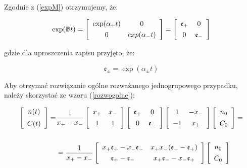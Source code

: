 	\noindent Zgodnie z (\ref{expM}) otrzymujemy, że:
	
	\begin{equation}
		\exp(\mathbb{B}t)=
		\left[\begin{array}{cc}
			\exp(\alpha_+t)&0\\
			\uu{0}&exp(\alpha_-t)
		\end{array}\right]=
		\left[\begin{array}{cc}
			\mathfrak{e}_+&0\\
			\uu{0}&\mathfrak{e}_-
		\end{array}\right]
		\label{expBe}
	\end{equation}
	
	\noindent gdzie dla uproszczenia zapisu przyjęto, że:
	
	\begin{equation}
		\mathfrak{e}_{\pm}=\exp(\alpha_{\pm}t)
		\label{eee}
	\end{equation}
	
	\noindent Aby otrzymać rozwiązanie ogólne rozważanego jednogrupowego przypadku, należy skorzystać ze wzoru (\ref{rozwogolne}):
	
	\begin{equation}
		\begin{aligned}
			\left[\begin{array}{c}
				n(t)\\
				\uu{C(t)}
			\end{array}\right]=&\frac{1}{x_+-x_-}
			\left[\begin{array}{cc}
				x_+&x_-\\
				\uu{1}&1
			\end{array}\right]
			\left[\begin{array}{cc}
				\mathfrak{e}_+&0\\
				\uu{0}&\mathfrak{e}_-
			\end{array}\right]
			\left[\begin{array}{cc}
				1&-x_-\\
				\uu{-1}&x_+
			\end{array}\right]
			\left[\begin{array}{c}
				n_0\\
				\uu{C_0}
			\end{array}\right]=\\
			&\\
			&=\frac{1}{x_+-x_-}
			\left[\begin{array}{cc}
				x_+\mathfrak{e}_+-x_-\mathfrak{e}_-&x_+x_-(\mathfrak{e}_--\mathfrak{e}_+)\\
				\uu{\mathfrak{e}_+-\mathfrak{e}_-}&x_+\mathfrak{e}_--x_-\mathfrak{e}_+
			\end{array}\right]
			\left[\begin{array}{c}
				n_0\\
				\uu{C_0}
			\end{array}\right]
			\label{jednorozwog}
		\end{aligned}
	\end{equation}
	
